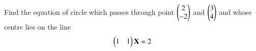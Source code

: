 Find the equation of circle which passes through point $\begin{pmatrix}2\\-2\end{pmatrix}$ and $\begin{pmatrix}3\\4\end{pmatrix}$ and whose centre lies on the line
\begin{align}
\begin{pmatrix}1&1\end{pmatrix}\mathbf{X}=2
\end{align}
